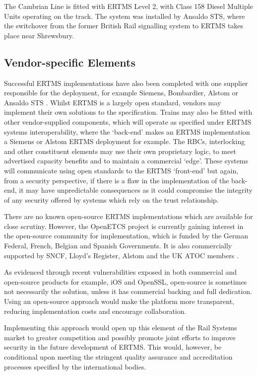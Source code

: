 \documentclass[twoside,11pt,a4paper]{article}
\begin{document}
The Cambrian Line is fitted with ERTMS Level 2, with Class 158 Diesel Multiple Units operating on the track. The system was installed by Ansaldo STS, where the switchover from the former British Rail signalling system to ERTMS takes place near Shrewsbury.

\subsection{Vendor-specific Elements}
Successful ERTMS implementations have also been completed with one supplier responsible for the deployment, for example Siemens, Bombardier, Alstom or Ansaldo STS \citep{UNIFE15a}. Whilst ERTMS is a largely open standard, vendors may implement their own solutions to the specification. Trains may also be fitted with other vendor-supplied components, which will operate as specified under ERTMS systems interoperability, where the `back-end' makes an ERTMS implementation a Siemens or Alstom ERTMS deployment for example. The RBCs, interlocking and other constituent elements may use their own proprietary logic, to meet advertised capacity benefits and to maintain a commercial `edge'. These systems will communicate using open standards to the ERTMS `front-end' but again, from a security perspective, if there is a flaw in the implementation of the back-end, it may have unpredictable consequences as it could compromise the integrity of any security offered by systems which rely on the trust relationship.

There are no known open-source ERTMS implementations which are available for close scrutiny. However, the OpenETCS project is currently gaining interest in the open-source community for implementation, which is funded by the German Federal, French, Belgian and Spanish Governments. It is also commercially supported by SNCF, Lloyd's Register, Alstom and the UK ATOC members \citep{openETCS15a}. 

As evidenced through recent vulnerabilities exposed in both commercial and open-source products for example, iOS and OpenSSL, open-source is sometimes not necessarily the solution, unless it has commercial backing and full dedication. Using an open-source approach would make the platform more transparent, reducing implementation costs and encourage collaboration.

Implementing this approach would open up this element of the Rail Systems market to greater competition and possibly promote joint efforts to improve security in the future development of ERTMS. This would, however, be conditional upon meeting the stringent quality assurance and accreditation processes specified by the international bodies.
\end{document}
